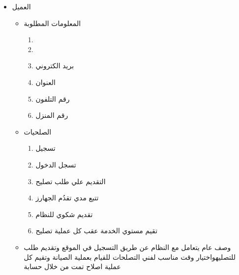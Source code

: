 \documentclass[25pt]{article}
\begin{document}
\begin{itemize}
	\item العميل
	\begin{itemize}
		\item المعلومات المطلوبة
		\begin{enumerate}
			\item{}
			\item{}
			\item بريد الكتروني
			\item العنوان 
			\item رقم التلفون
			\item رقم المنزل
		\end{enumerate}
		\item الصلحيات
		\begin{enumerate}
			\item تسجيل 
			\item تسجل الدخول
			\item التقديم علي طلب تصليح
			\item تتبع مدي تقدُم الجهارز 
			\item  تقديم شكوي للنظام
			\item تقيم مستوي الخدمة عقب كل عملية تصليح
			\newline
		\end{enumerate}
		\item وصف عام 
		\newline
		يتعامل مع النظام عن طريق التسجيل في الموقع وتقديم طلب للتصليهواختيار وقت مناسب لفني التصلحات  للقيام بعملية الصيانة وتقيم كل عملية اصلاح تمت من خلال حسابة	
		\newline
		\newline
	\end{itemize}
	\end{itemize}
	
\end{document}
